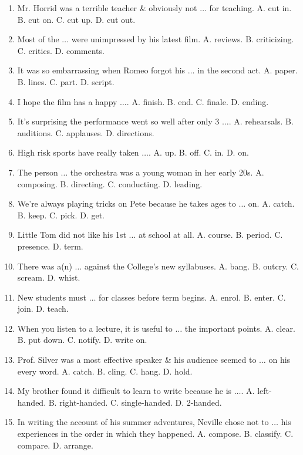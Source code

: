 \documentclass{article}
\numberwithin{equation}{section}
\begin{document}
\begin{enumerate}[leftmargin=2mm]
	\item Mr. Horrid was a terrible teacher \& obviously not $\ldots$ for teaching. {\sf A.} cut in. {\sf B.} cut on. {\sf C.} cut up. {\sf D.} cut out.
	\item Most of the $\ldots$ were unimpressed by his latest film. {\sf A.} reviews. {\sf B.} criticizing. {\sf C.} critics. {\sf D.} comments.
	\item It was so embarrassing when Romeo forgot his $\ldots$ in the second act. {\sf A.} paper. {\sf B.} lines. {\sf C.} part. {\sf D.} script.
	\item I hope the film has a happy $\ldots$. {\sf A.} finish. {\sf B.} end. {\sf C.} finale. {\sf D.} ending.
	\item It's surprising the performance went so well after only 3 $\ldots$. {\sf A.} rehearsals. {\sf B.} auditions. {\sf C.} applauses. {\sf D.} directions.
	\item High risk sports have really taken $\ldots$. {\sf A.} up. {\sf B.} off. {\sf C.} in. {\sf D.} on.
	\item The person $\ldots$ the orchestra was a young woman in her early 20s. {\sf A.} composing. {\sf B.} directing. {\sf C.} conducting. {\sf D.} leading.
	\item We're always playing tricks on Pete because he takes ages to $\ldots$ on. {\sf A.} catch. {\sf B.} keep. {\sf C.} pick. {\sf D.} get.
	\item Little Tom did not like his 1st $\ldots$ at school at all. {\sf A.} course. {\sf B.} period. {\sf C.} presence. {\sf D.} term.
	\item There was a(n) $\ldots$ against the College's new syllabuses. {\sf A.} bang. {\sf B.} outcry. {\sf C.} scream. {\sf D.} whist.
	\item New students must $\ldots$ for classes before term begins. {\sf A.} enrol. {\sf B.} enter. {\sf C.} join. {\sf D.} teach.
	\item When you listen to a lecture, it is useful to $\ldots$ the important points. {\sf A.} clear. {\sf B.} put down. {\sf C.} notify. {\sf D.} write on.
	\item Prof. Silver was a most effective speaker \& his audience seemed to $\ldots$ on his every word. {\sf A.} catch. {\sf B.} cling. {\sf C.} hang. {\sf D.} hold.
	\item My brother found it difficult to learn to write because he is $\ldots$. {\sf A.} left-handed. {\sf B.} right-handed. {\sf C.} single-handed. {\sf D.} 2-handed.
	\item In writing the account of his summer adventures, Neville chose not to $\ldots$ his experiences in the order in which they happened. {\sf A.} compose. {\sf B.} classify. {\sf C.} compare. {\sf D.} arrange.

\end{enumerate}
\end{document}
